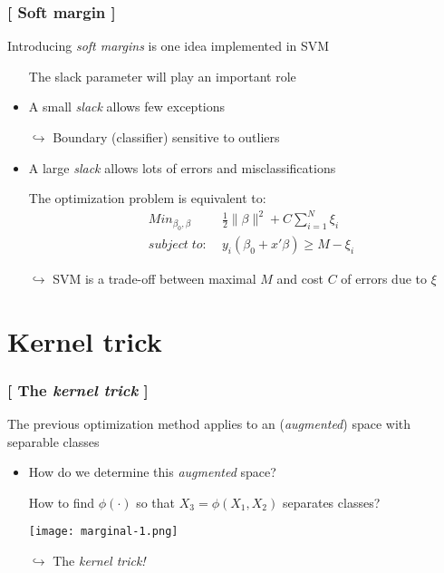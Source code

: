 \documentclass[xcolor=x11names,compress, handhouts]{beamer}
\renewcommand{\(}{\begin{columns}}
\renewcommand{\)}{\end{columns}}
\newcommand{\<}[1]{\begin{column}{#1}}
\renewcommand{\>}{\end{column}}
\begin{document}
\begin{frame}
\frametitle{\textcolor{brique}{[ Soft margin ]}}
Introducing \textit{soft margins} is one idea implemented in SVM
\pause
\begin{itemize}[<+->]
    \item[] The slack parameter will play an important role
    \item A small \textit{slack} allows few exceptions
    \item[$\hookrightarrow$] Boundary (classifier) sensitive to outliers
    \item A large \textit{slack} allows lots of errors and misclassifications
    \item[] The optimization problem  is equivalent to:
    \begin{eqnarray}
                & Min_{\beta_0, \beta} &  \frac{1}{2} \| \beta \|^2 + C \sum_{i=1}^N \xi_i  \\
        \nonumber       & subject\; to:\; &  y_i(\beta_0 +x'\beta) \geq  M - \xi_i
    \end{eqnarray}
    \item[$\hookrightarrow$] SVM is a trade-off between maximal $M$ and cost $C$ of errors due to $\xi$
\end{itemize}
\end{frame}


\section{Kernel trick}


\begin{frame}
\frametitle{\textcolor{brique}{[ The \textit{kernel trick} ]}}
The previous optimization method applies to an (\textit{augmented}) space with separable classes
\pause
\begin{itemize}[<+->]
    \item How do we determine this \textit{augmented} space?
    \item[] How to find $\phi(\cdot)$ so that $X_3 = \phi(X_1, X_2)$  separates classes?
    \item[] \texttt{[image: marginal-1.png]}
    \item[$\hookrightarrow$] The \emph{kernel trick!}
\end{itemize}
\end{frame}
\end{document}
